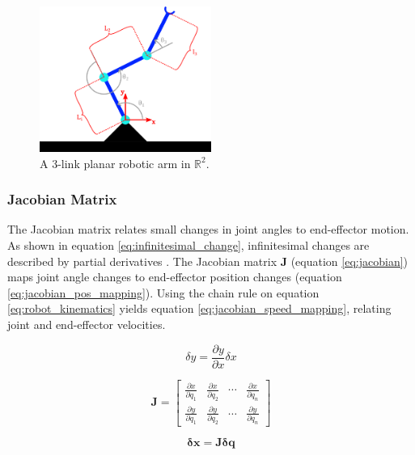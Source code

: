 \begin{figure}[H]
    \centering
    \includegraphics[width=0.5\textwidth]{Images/manipulator_inkscape.png}
    \caption{A 3-link planar robotic arm in $\mathbb{R}^2$.}
    \label{fig:robotic_link_arm}
\end{figure}

\subsubsection{Jacobian Matrix}

The Jacobian matrix relates small changes in joint angles to end-effector motion. As shown in equation \ref{eq:infinitesimal_change}, infinitesimal changes are described by partial derivatives \cite{modsim}. The Jacobian matrix $\bm{J}$ (equation \ref{eq:jacobian}) maps joint angle changes to end-effector position changes (equation \ref{eq:jacobian_pos_mapping}). Using the chain rule on equation \ref{eq:robot_kinematics} yields equation \ref{eq:jacobian_speed_mapping}, relating joint and end-effector velocities.

\begin{equation}
    \label{eq:infinitesimal_change}
    \delta  y = \frac{\partial y}{\partial x} \delta x
\end{equation}

\begin{equation}
    \label{eq:jacobian}
    \bm{J} = \begin{bmatrix}
        \frac{\partial x}{\partial q_1} & \frac{\partial x}{\partial q_2} & \cdots & \frac{\partial x}{\partial q_n} \\
        \frac{\partial y}{\partial q_1} & \frac{\partial y}{\partial q_2} & \cdots & \frac{\partial y}{\partial q_n}
    \end{bmatrix}
\end{equation}

\begin{equation}
    \label{eq:jacobian_pos_mapping}
    \bm{\delta x} = \bm{J}\bm{\delta q}
\end{equation}

